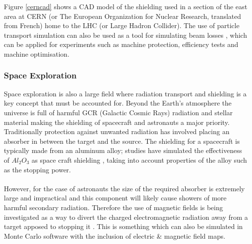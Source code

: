 \documentclass[12pt,a4paper]{article}
\begin{document}
\noindent Figure \ref{cerncad} shows a CAD model of the shielding used in a section of the east area at CERN (or The European Organization for Nuclear Research, translated from French) home to the LHC (or Large Hadron Collider). The use of particle transport simulation can also be used as a tool for simulating beam losses \cite{pyg4om}, which can be applied for experiments such as machine protection, efficiency tests and machine optimisation.

\subsubsection{Space Exploration}
\noindent Space exploration is also a large field where radiation transport and shielding is a key concept that must be accounted for. Beyond the Earth's atmosphere the universe is full of harmful GCR (Galactic Cosmic Rays) radiation and stellar material making the shielding of spacecraft and astronauts a major priority. Traditionally protection against unwanted radiation has involved placing an absorber in between the target and the source. The shielding for a spacecraft is typically made from an aluminum alloy; studies have simulated the effectiveness of $Al_2O_3$ as space craft shielding \cite{spacesh}, taking into account properties of the alloy such as the stopping power. 
\\\\
\noindent However, for the case of astronauts the size of the required absorber is extremely large and impractical and this component will likely cause showers of more harmful secondary radiation. Therefore the use of magnetic fields is being investigated as a way to divert the charged electromagnetic radiation away from a target apposed to stopping it \cite{magf}. This is something which can also be simulated in Monte Carlo software with the inclusion of electric \& magnetic field maps.
\end{document}
